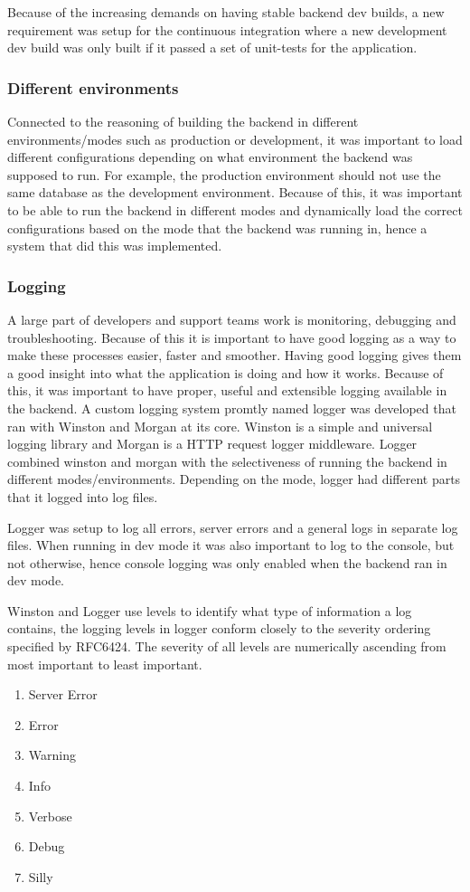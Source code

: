 Because of the increasing demands on having stable backend dev builds, a new requirement was setup for the continuous integration where a new development dev build was only built if it passed a set of unit-tests for the application.

\subsubsection{Different environments}
Connected to the reasoning of building the backend in different environments/modes such as production or development, it was important to load different configurations depending on what environment the backend was supposed to run. For example, the production environment should not use the same database as the development environment. Because of this, it was important to be able to run the backend in different modes and dynamically load the correct configurations based on the mode that the backend was running in, hence a system that did this was implemented.

\subsubsection{Logging}
A large part of developers and support teams work is monitoring, debugging and troubleshooting. Because of this it is important to have good logging as a way to make these processes easier, faster and smoother. Having good logging gives them a good insight into what the application is doing and how it works. Because of this, it was important to have proper, useful and extensible logging available in the backend. A custom logging system promtly named logger was developed that ran with Winston and Morgan at its core. Winston is a simple and universal logging library and Morgan is a HTTP request logger middleware. Logger combined winston and morgan with the selectiveness of running the backend in different modes/environments. Depending on the mode, logger had different parts that it logged into log files.

Logger was setup to log all errors, server errors and a general logs in separate log files. When running in dev mode it was also important to log to the console, but not otherwise, hence console logging was only enabled when the backend ran in dev mode.

Winston and Logger use levels to identify what type of information a log contains, the logging levels in logger conform closely to the severity ordering specified by RFC6424.
The severity of all levels are numerically ascending from most important to least important.
\begin{enumerate}
  \item Server Error
  \item Error
  \item Warning
  \item Info
  \item Verbose
  \item Debug
  \item Silly
\end{enumerate}

